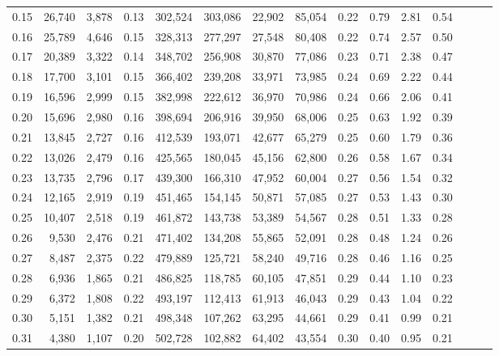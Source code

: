 \begin{tabular}{rrrrrrrrrrrrrrr}
0.15 &  26,740 &  3,878 &  0.13 &  302,524 &  303,086 &   22,902 &   85,054 &  0.22 &  0.79 &  2.81 &      0.54 \\
0.16 &  25,789 &  4,646 &  0.15 &  328,313 &  277,297 &   27,548 &   80,408 &  0.22 &  0.74 &  2.57 &      0.50 \\
0.17 &  20,389 &  3,322 &  0.14 &  348,702 &  256,908 &   30,870 &   77,086 &  0.23 &  0.71 &  2.38 &      0.47 \\
0.18 &  17,700 &  3,101 &  0.15 &  366,402 &  239,208 &   33,971 &   73,985 &  0.24 &  0.69 &  2.22 &      0.44 \\
0.19 &  16,596 &  2,999 &  0.15 &  382,998 &  222,612 &   36,970 &   70,986 &  0.24 &  0.66 &  2.06 &      0.41 \\
0.20 &  15,696 &  2,980 &  0.16 &  398,694 &  206,916 &   39,950 &   68,006 &  0.25 &  0.63 &  1.92 &      0.39 \\
0.21 &  13,845 &  2,727 &  0.16 &  412,539 &  193,071 &   42,677 &   65,279 &  0.25 &  0.60 &  1.79 &      0.36 \\
0.22 &  13,026 &  2,479 &  0.16 &  425,565 &  180,045 &   45,156 &   62,800 &  0.26 &  0.58 &  1.67 &      0.34 \\
0.23 &  13,735 &  2,796 &  0.17 &  439,300 &  166,310 &   47,952 &   60,004 &  0.27 &  0.56 &  1.54 &      0.32 \\
0.24 &  12,165 &  2,919 &  0.19 &  451,465 &  154,145 &   50,871 &   57,085 &  0.27 &  0.53 &  1.43 &      0.30 \\
0.25 &  10,407 &  2,518 &  0.19 &  461,872 &  143,738 &   53,389 &   54,567 &  0.28 &  0.51 &  1.33 &      0.28 \\
0.26 &   9,530 &  2,476 &  0.21 &  471,402 &  134,208 &   55,865 &   52,091 &  0.28 &  0.48 &  1.24 &      0.26 \\
0.27 &   8,487 &  2,375 &  0.22 &  479,889 &  125,721 &   58,240 &   49,716 &  0.28 &  0.46 &  1.16 &      0.25 \\
0.28 &   6,936 &  1,865 &  0.21 &  486,825 &  118,785 &   60,105 &   47,851 &  0.29 &  0.44 &  1.10 &      0.23 \\
0.29 &   6,372 &  1,808 &  0.22 &  493,197 &  112,413 &   61,913 &   46,043 &  0.29 &  0.43 &  1.04 &      0.22 \\
0.30 &   5,151 &  1,382 &  0.21 &  498,348 &  107,262 &   63,295 &   44,661 &  0.29 &  0.41 &  0.99 &      0.21 \\
0.31 &   4,380 &  1,107 &  0.20 &  502,728 &  102,882 &   64,402 &   43,554 &  0.30 &  0.40 &  0.95 &      0.21 \\

\end{tabular}
